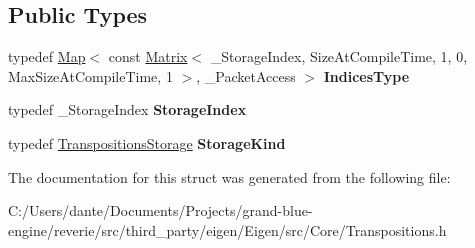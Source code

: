 \subsection*{Public Types}
\begin{DoxyCompactItemize}
\item 
\mbox{\label{struct_eigen_1_1internal_1_1traits_3_01_map_3_01_transpositions_3_01_size_at_compile_time_00_01_1a60846531a8bf67fbbfd4180820bbd1_aef77ab5aeac1d5d76a4916f38ed30fe3}} 
typedef \mbox{\hyperlink{class_eigen_1_1_map}{Map}}$<$ const \mbox{\hyperlink{class_eigen_1_1_matrix}{Matrix}}$<$ \+\_\+\+Storage\+Index, Size\+At\+Compile\+Time, 1, 0, Max\+Size\+At\+Compile\+Time, 1 $>$, \+\_\+\+Packet\+Access $>$ {\bfseries Indices\+Type}
\item 
\mbox{\label{struct_eigen_1_1internal_1_1traits_3_01_map_3_01_transpositions_3_01_size_at_compile_time_00_01_1a60846531a8bf67fbbfd4180820bbd1_ab81b76d6ea129d36f31200ca3a778278}} 
typedef \+\_\+\+Storage\+Index {\bfseries Storage\+Index}
\item 
\mbox{\label{struct_eigen_1_1internal_1_1traits_3_01_map_3_01_transpositions_3_01_size_at_compile_time_00_01_1a60846531a8bf67fbbfd4180820bbd1_a8d32ad3349c273f89a2e2e25b19bf182}} 
typedef \mbox{\hyperlink{struct_eigen_1_1_transpositions_storage}{Transpositions\+Storage}} {\bfseries Storage\+Kind}
\end{DoxyCompactItemize}


The documentation for this struct was generated from the following file\+:\begin{DoxyCompactItemize}
\item 
C\+:/\+Users/dante/\+Documents/\+Projects/grand-\/blue-\/engine/reverie/src/third\+\_\+party/eigen/\+Eigen/src/\+Core/Transpositions.\+h\end{DoxyCompactItemize}
